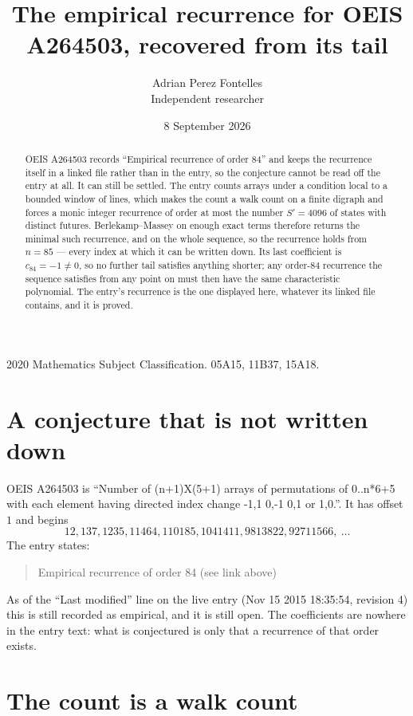 \documentclass[11pt,a4paper]{article}
\title{The empirical recurrence for OEIS A264503, recovered from its tail}
\author{Adrian Perez Fontelles\\ \small Independent researcher}
\date{8 September 2026}
\theoremstyle{plain}
\theoremstyle{definition}
\begin{document}
\maketitle

\begin{abstract}
OEIS A264503 records ``Empirical recurrence of order $84$'' and keeps the recurrence itself in
a linked file rather than in the entry, so the conjecture cannot be read off the entry at all.
It can still be settled. The entry counts arrays under a condition local to a bounded window of
lines, which makes the count a walk count on a finite digraph and forces a monic integer
recurrence of order at most the number $S'=4096$ of states with distinct futures. Berlekamp--Massey on
enough exact terms therefore returns the minimal such recurrence, and on the whole sequence, so the recurrence holds from $n=85$ --- every index at which it can be written down.
Its last coefficient is $c_{84}=-1\neq0$, so no further tail satisfies anything
shorter; any order-$84$ recurrence the sequence satisfies from any point on must then have
the same characteristic polynomial. The entry's recurrence is the one displayed here, whatever
its linked file contains, and it is proved.
\end{abstract}

\noindent\small 2020 Mathematics Subject Classification. 05A15, 11B37, 15A18.\normalsize

\section{A conjecture that is not written down}

OEIS A264503 is ``Number of (n+1)X(5+1) arrays of permutations of 0..n*6+5 with each element having directed index change -1,1 0,-1 0,1 or 1,0.''. It has offset $1$ and begins
\[
12, 137, 1235, 11464, 110185, 1041411, 9813822, 92711566,\ \dots
\]
The entry states:
\begin{quote}
Empirical recurrence of order 84 (see link above)
\end{quote}
As of the ``Last modified'' line on the live entry (Nov 15 2015 18:35:54, revision 4)
this is still recorded as empirical, and it is still open. The coefficients are nowhere in the
entry text: what is conjectured is only that a recurrence of that order exists.

\section{The count is a walk count}
\end{document}
